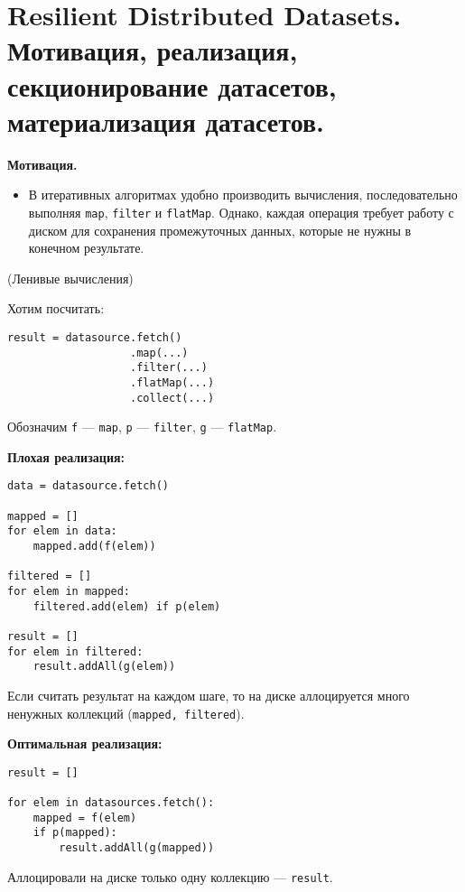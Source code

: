 \section{Resilient Distributed Datasets. Мотивация, реализация,
  секционирование датасетов, материализация датасетов.}

\textbf{Мотивация.}
\begin{itemize}
  \item В итеративных алгоритмах удобно производить вычисления,
    последовательно выполняя \texttt{map}, \texttt{filter} и \texttt{flatMap}.
    Однако, каждая операция требует работу с диском для сохранения
    промежуточных данных, которые не нужны в конечном результате.
\end{itemize}


\begin{example}(Ленивые вычисления)

    Хотим посчитать:
    \begin{lstlisting}
result = datasource.fetch()
                   .map(...)
                   .filter(...)
                   .flatMap(...)
                   .collect(...)
    \end{lstlisting}

    Обозначим \texttt{f} --- \texttt{map}, \texttt{p} --- \texttt{filter}, \texttt{g} --- \texttt{flatMap}.

    \textbf{Плохая реализация:}

    \begin{lstlisting}
data = datasource.fetch()

mapped = []
for elem in data:
    mapped.add(f(elem))

filtered = []
for elem in mapped:
    filtered.add(elem) if p(elem)

result = []
for elem in filtered:
    result.addAll(g(elem))
    \end{lstlisting}

    Если считать результат на каждом шаге, то на диске аллоцируется много ненужных коллекций (\texttt{mapped, filtered}).

    \textbf{Оптимальная реализация:}

    \begin{lstlisting}
result = []

for elem in datasources.fetch():
    mapped = f(elem)
    if p(mapped):
        result.addAll(g(mapped))
  \end{lstlisting}

    Аллоцировали на диске только одну коллекцию --- \texttt{result}.
\end{example}


